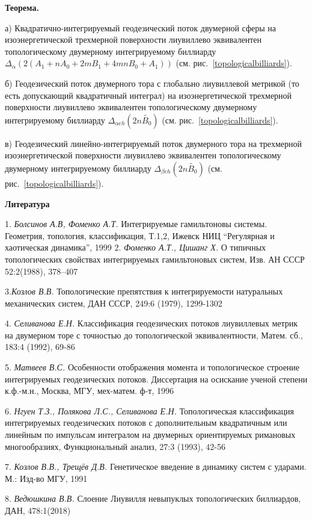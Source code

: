 \textbf{Теорема.}{\it

а) Квадратично-интегрируемый геодезический поток двумерной сферы на  изоэнергетической трехмерной поверхности лиувиллево эквивалентен топологическому двумерному интегрируемому биллиарду   $\Delta_\alpha(2(A_1+nA_0+2mB_1+4mnB_0+A_1))   $ (см. рис.~\ref{topologicalbilliards}).

б) Геодезический поток двумерного тора с глобально лиувиллевой метрикой (то есть допускающий квадратичный интеграл) на изоэнергетической трехмерной поверхности лиувиллево эквивалентен топологическому двумерному интегрируемому биллиарду $\Delta_{\alpha eh}(2n \widetilde{B_0})  $ (см. рис.~\ref{topologicalbilliards}).

в) Геодезический линейно-интегрируемый поток двумерного тора на трехмерной изоэнергетической поверхности лиувиллево эквивалентен топологическому двумерному интегрируемому биллиарду  $\Delta_{\beta eh}(2n \widetilde{B_0})   $ (см. рис.~\ref{topologicalbilliards}).
}


\smallskip \centerline{\bf Литература}\nopagebreak



1. {\it Болсинов А.В, Фоменко А.Т.} Интегрируемые гамильтоновы системы.
Геометрия, топология, классификация, Т.1,2,
   Ижевск
   НИЦ ``Регулярная и хаотическая динамика'',
  1999
2. {\it  Фоменко А.Т., Цишанг Х.} О типичных топологических свойствах
интегрируемых гамильтоновых систем,  Изв. АН СССР
   52:2(1988),
  378--407

  3.{\it Козлов В.В. } Топологические препятствия к интегрируемости натуральных механических систем, ДАН СССР, 249:6 (1979), 1299-1302

  4. {\it Селиванова Е.Н. }Классификация геодезических потоков лиувиллевых метрик на двумерном торе с точностью до топологической эквивалентности,  Матем. сб., 183:4 (1992), 69-86

   5. {\it Матвеев В.С. } Особенности отображения момента и топологическое строение интегрируемых геодезических потоков. Диссертация на осискание ученой степени к.ф.-м.н.,  Москва, МГУ, мех-матем. ф-т, 1996

    6. {\it Нгуен Т.З., Полякова Л.С., Селиванова Е.Н.} Топологическая классификация интегрируемых геодезических потоков с дополнительным квадратичным или линейным по импульсам интегралом на двумерных ориентируемых римановых многообразиях, Функциональный анализ, 27:3 (1993), 42-56

  7. {\it Козлов В.В., Трещёв Д.В.} Генетическое  введение в динамику систем с ударами. М.: Изд-во МГУ, 1991

  8. {\it Ведюшкина В.В.} Слоение Лиувилля невыпуклых топологических биллиардов, ДАН, 478:1(2018)
